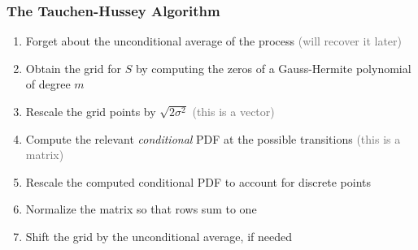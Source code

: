 \documentclass[10pt, aspectratio=1610, handout]{beamer}
\newcommand{\dimmer}[1]{\textcolor{dimgray}{#1}}
\begin{document}
  \begin{frame}
    \frametitle{The Tauchen-Hussey Algorithm}

    \begin{enumerate}
      \item Forget about the unconditional average of the process \hfill \dimmer{(will recover it later)}
      \vfill\pause
      \item Obtain the grid for $S$ by computing the zeros of a Gauss-Hermite polynomial of degree $m$
      \vfill\pause
      \item Rescale the grid points by $\sqrt{2\sigma^2}$ \hfill \dimmer{(this is a vector)}
      \vfill\pause
      \item Compute the relevant \textit{conditional} PDF at the possible transitions \hfill \dimmer{(this is a matrix)}
      \vfill\pause
      \item Rescale the computed conditional PDF to account for discrete points
      \vfill\pause
      \item Normalize the matrix so that rows sum to one
      \vfill\pause
      \item Shift the grid by the unconditional average, if needed
    \end{enumerate}

  \end{frame}
\end{document}
